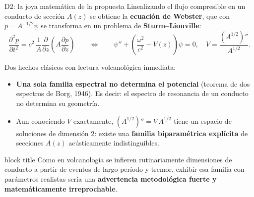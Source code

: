 \documentclass[aspectratio=169,10pt,t]{beamer}
\newcommand{\mensaje}[1]{%
  \vfill
  \begin{beamercolorbox}[wd=\linewidth,sep=0.4em,rounded=true]{block title}
  \footnotesize #1
  \end{beamercolorbox}}
\begin{document}
\begin{frame}{D2: la joya matemática de la propuesta}
\small
Linealizando el flujo compresible en un conducto de sección $A(z)$ se obtiene la
\textbf{ecuación de Webster}, que con $p=A^{-1/2}\psi$ se transforma en un
problema de \textbf{Sturm–Liouville}:
\vspace{-0.3em}
$$\frac{\partial^2p}{\partial t^2}=c^2\,\frac1A\frac{\partial}{\partial z}\!\left(A\frac{\partial p}{\partial z}\right)
\qquad\Longleftrightarrow\qquad
\psi''+\left(\frac{\omega^2}{c^2}-V(z)\right)\psi=0,\quad V=\frac{(A^{1/2})''}{A^{1/2}}.$$
\vspace{-1.0em}

Dos hechos clásicos con lectura volcanológica inmediata:
\begin{itemize}
  \item \textbf{Una sola familia espectral no determina el potencial} (teorema
    de dos espectros de Borg, 1946). Es decir: \alert{el espectro de resonancia
    de un conducto no determina su geometría}.
  \item Aun conociendo $V$ exactamente, $(A^{1/2})''=V\,A^{1/2}$ tiene un
    espacio de soluciones de \alert{dimensión 2}: existe una \textbf{familia
    biparamétrica explícita} de secciones $A(z)$ acústicamente indistinguibles.
\end{itemize}

\mensaje{Como en volcanología se infieren rutinariamente dimensiones de conducto
a partir de eventos de largo período y tremor, exhibir esa familia con
parámetros realistas sería una \textbf{advertencia metodológica fuerte y
matemáticamente irreprochable}.}
\end{frame}
\end{document}
